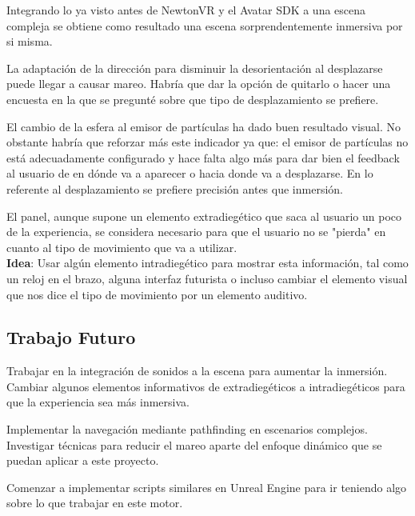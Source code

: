 \documentclass[12pt,a4paper]{article}
\begin{document}
Integrando lo ya visto antes de NewtonVR y el Avatar SDK a una escena compleja se obtiene como resultado una escena sorprendentemente inmersiva por si misma.

La adaptación de la dirección para disminuir la desorientación al desplazarse puede llegar a causar mareo. Habría que dar la opción de quitarlo o hacer una encuesta en la que se pregunté sobre que tipo de desplazamiento se prefiere.

El cambio de la esfera al emisor de partículas ha dado buen resultado visual. No obstante habría que reforzar más este indicador ya que: el emisor de partículas no está adecuadamente configurado y hace falta algo más para dar bien el feedback al usuario de en dónde va a aparecer o hacia donde va a desplazarse. En lo referente al desplazamiento se prefiere precisión antes que inmersión.

El panel, aunque supone un elemento extradiegético que saca al usuario un poco de la experiencia, se considera necesario para que el usuario no se "pierda" en cuanto al tipo de movimiento que va a utilizar.\\
\textbf{Idea}: Usar algún elemento intradiegético para mostrar esta información, tal como un reloj en el brazo, alguna interfaz futurista o incluso cambiar el elemento visual que nos dice el tipo de movimiento por un elemento auditivo.

\subsection{Trabajo Futuro}

Trabajar en la integración de sonidos a la escena para aumentar la inmersión.
Cambiar algunos elementos informativos de extradiegéticos a intradiegéticos para que la experiencia sea más inmersiva.

Implementar la navegación mediante pathfinding en escenarios complejos.
Investigar técnicas para reducir el mareo aparte del enfoque dinámico que se puedan aplicar a este proyecto.

Comenzar a implementar scripts similares en Unreal Engine para ir teniendo algo sobre lo que trabajar en este motor.
\end{document}
